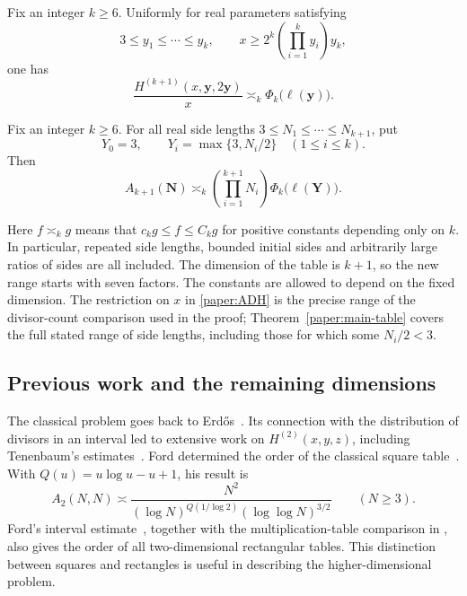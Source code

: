 \begin{theorem}
\label{paper:main-H}
Fix an integer $k\geq6$. Uniformly for real parameters satisfying
\begin{equation}
 3\leq y_1\leq\cdots\leq y_k,
 \qquad
 x\geq2^k\left(\prod_{i=1}^k y_i\right)y_k,
 \label{paper:ADH}
\end{equation}
one has
\[
 \frac{H^{(k+1)}(x,\mathbf y,2\mathbf y)}{x}
 \asymp_k \Phi_k\bigl(\ell(\mathbf y)\bigr).
\]
\end{theorem}

\begin{theorem}
\label{paper:main-table}
Fix an integer $k\geq6$. For all real side lengths
$3\leq N_1\leq\cdots\leq N_{k+1}$, put
\[
 Y_0=3,\qquad Y_i=\max\{3,N_i/2\}\quad(1\leq i\leq k).
\]
Then
\[
 A_{k+1}(\mathbf N)
 \asymp_k
 \left(\prod_{i=1}^{k+1}N_i\right)
 \Phi_k\bigl(\ell(\mathbf Y)\bigr).
\]
\end{theorem}

Here $f\asymp_k g$ means that $c_kg\leq f\leq C_kg$ for positive
constants depending only on $k$. In particular, repeated side lengths,
bounded initial sides and arbitrarily large ratios of sides are all
included. The dimension of the table is $k+1$, so the new range starts
with seven factors. The constants are allowed to depend on the fixed
dimension. The restriction on $x$ in \eqref{paper:ADH} is the precise
range of the divisor-count comparison used in the proof;
Theorem~\ref{paper:main-table} covers the full stated range of side
lengths, including those for which some $N_i/2<3$.

\subsection{Previous work and the remaining dimensions}

The classical problem goes back to Erd\H{o}s~\cite{Erdos1955}.
Its connection with the distribution of divisors in an interval led to
extensive work on $H^{(2)}(x,y,z)$, including Tenenbaum's
estimates~\cite{Tenenbaum1984}. Ford determined the order of the
classical square table~\cite[Corollary~3]{FordDivisors2008}. With
$Q(u)=u\log u-u+1$, his result is
\[
 A_2(N,N)\asymp
 \frac{N^2}{(\log N)^{Q(1/\log2)}(\log\log N)^{3/2}}
 \qquad(N\geq3).
\]
Ford's interval estimate~\cite[Corollary~2]{FordDivisors2008}, together
with the multiplication-table comparison in
\cite[Theorem~1.1]{Kouk}, also gives the order of all two-dimensional
rectangular tables. This distinction between squares and rectangles is
useful in describing the higher-dimensional problem.

